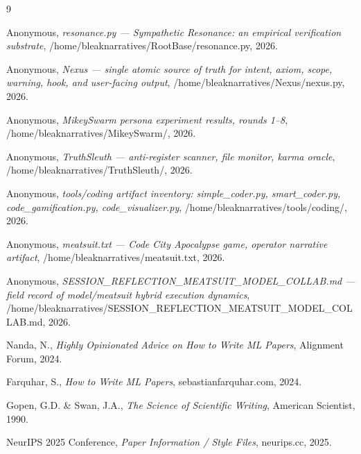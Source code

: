 \documentclass[10pt,twocolumn]{article}
\begin{document}
\begin{thebibliography}{9}

  Anonymous,
  \emph{resonance.py — Sympathetic Resonance: an empirical verification substrate},
  /home/bleaknarratives/RootBase/resonance.py,
  2026.

  Anonymous,
  \emph{Nexus — single atomic source of truth for intent, axiom, scope, warning, hook, and user-facing output},
  /home/bleaknarratives/Nexus/nexus.py,
  2026.

  Anonymous,
  \emph{MikeySwarm persona experiment results, rounds 1--8},
  /home/bleaknarratives/MikeySwarm/,
  2026.

  Anonymous,
  \emph{TruthSleuth — anti-register scanner, file monitor, karma oracle},
  /home/bleaknarratives/TruthSleuth/,
  2026.

  Anonymous,
  \emph{tools/coding artifact inventory: simple\_coder.py, smart\_coder.py, code\_gamification.py, code\_visualizer.py},
  /home/bleaknarratives/tools/coding/,
  2026.

  Anonymous,
  \emph{meatsuit.txt — Code City Apocalypse game, operator narrative artifact},
  /home/bleaknarratives/meatsuit.txt,
  2026.

  Anonymous,
  \emph{SESSION\_REFLECTION\_MEATSUIT\_MODEL\_COLLAB.md — field record of model/meatsuit hybrid execution dynamics},
  /home/bleaknarratives/SESSION_REFLECTION_MEATSUIT_MODEL_COLLAB.md,
  2026.

  Nanda, N.,
  \emph{Highly Opinionated Advice on How to Write ML Papers},
  Alignment Forum, 2024.

  Farquhar, S.,
  \emph{How to Write ML Papers},
  sebastianfarquhar.com, 2024.

  Gopen, G.D. \& Swan, J.A.,
  \emph{The Science of Scientific Writing},
  American Scientist, 1990.

  NeurIPS 2025 Conference,
  \emph{Paper Information / Style Files},
  neurips.cc, 2025.

\end{thebibliography}
\end{document}
